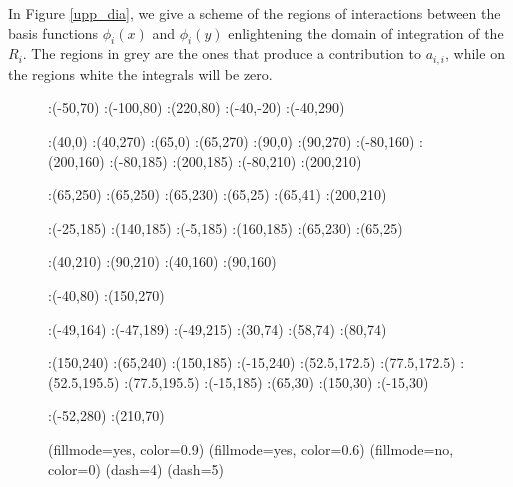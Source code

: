 {In Figure \ref{upp_dia}, we give a scheme of the regions of interactions between the basis functions $\phi_i(x)$ and $\phi_i(y)$ enlightening the domain of integration of the $R_i$. The regions in grey are the ones that produce a contribution to $a_{i,i}$, while on the regions white the integrals will be zero.
\begin{figure}
\figinit{0.8pt}
:(-50,70)
:(-100,80) :(220,80)
:(-40,-20) :(-40,290)

:(40,0) :(40,270)
:(65,0) :(65,270)
:(90,0) :(90,270)
%
:(-80,160) :(200,160)
:(-80,185) :(200,185)
:(-80,210) :(200,210)

:(65,250) :(65,250)
:(65,230) :(65,25)
:(65,41) :(200,210)

:(-25,185) :(140,185)
:(-5,185) :(160,185)
:(65,230) :(65,25)

%

:(40,210) :(90,210)
:(40,160) :(90,160)

:(-40,80) :(150,270)

:(-49,164) :(-47,189) :(-49,215) 
:(30,74) :(58,74) :(80,74) 

:(150,240) :(65,240) :(150,185) 
:(-15,240) :(52.5,172.5) :(77.5,172.5) 
:(52.5,195.5) :(77.5,195.5) :(-15,185) 
:(65,30) :(150,30) :(-15,30) 

:(-52,280) :(210,70)


\figdrawbegin{}

\figset(fillmode=yes, color=0.9)
\figdrawline[29,30,10,6,29]
\figdrawline[30,32,12,16,30]
\figdrawline[32,31,5,9,32]
\figdrawline[31,11,15,29,31]
\figset(fillmode=yes, color=0.6)
\figdrawline[29,30,32,31,29]
\figset(fillmode=no, color=0)
\figdrawarrow[1,2]
\figdrawarrow[3,4]
\figdrawline[5,6]
\figdrawline[9,10]
\figdrawline[11,12]
\figdrawline[15,16]
\figset(dash=4)
\figdrawline[7,56]
\figdrawline[57,55]
\figdrawline[53,8]
\figdrawline[13,59]
\figdrawline[60,61]
\figdrawline[62,14]
\figset(dash=5)
\figdrawline[33,34]
\figdrawend


\end{figure}}

